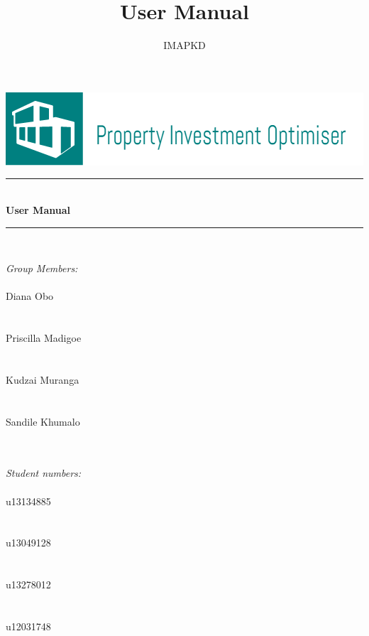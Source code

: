 \documentclass[a4paper,12pt]{article}
\author{IMAPKD}
\title{ User Manual}
\newcommand{\HRule}{\rule{\linewidth}{0.5mm}}
\begin{document}
\setlength{\parskip}{6pt}

\begin{titlepage}

\begin{center}
\includegraphics[width=1\textwidth]{./Logo.png}\\[0.4cm]


\HRule \\[0.4cm]
{ \huge \bfseries User Manual}\\[0.1cm]
\HRule \\[0.4cm]  


\begin{minipage}{0.4\textwidth}
\begin{flushleft} \large

\emph{\Large Group Members:}\\[0.4cm]    
\emph{}\\
{\Large Diana {Obo}} \\
\emph{}\\
\emph{}\\
{\Large Priscilla {Madigoe}}\\
\emph{}\\
\emph{}\\
{\Large Kudzai {Muranga}} \\
\emph{}\\
\emph{}\\
{\Large Sandile {Khumalo}}\\
\emph{}\\
\emph{}\\

\end{flushleft}
\end{minipage}
\begin{minipage}{0.4\textwidth}
\begin{flushright} \large

\emph{ \Large Student numbers:} \\[0.4cm]  
\emph{}\\
{\Large u13134885}\\
\emph{}\\
\emph{}\\
{\Large u13049128}\\
\emph{}\\
\emph{}\\
{\Large u13278012}\\
\emph{}\\
\emph{}\\
{\Large u12031748}\\
\emph{}\\
\emph{}\\


\end{flushright}
\end{minipage}
\end{center}
\end{titlepage}
\end{document}
